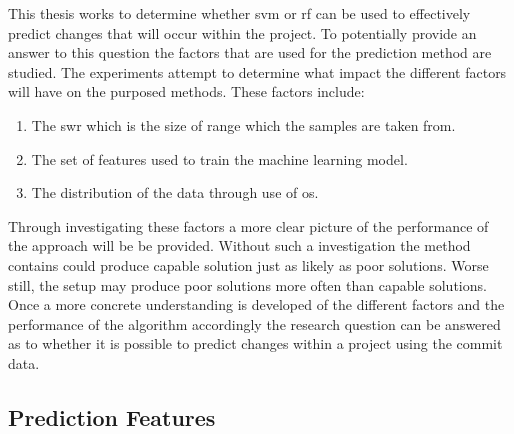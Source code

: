 This thesis works to determine whether \gls{svm} or \gls{rf} can be used to effectively predict changes that will occur within the project. To potentially provide an answer to this question the factors that are used for the prediction method are studied. The experiments attempt to determine what impact the different factors will have on the purposed methods. These factors include:
\begin{enumerate}
\item The \gls{swr} which is the size of range which the samples are taken from.
\item The set of features used to train the machine learning model.
\item The distribution of the data through use of \gls{os}.
\end{enumerate}

Through investigating these factors a more clear picture of the performance of the approach will be be provided. Without such a investigation the method contains could produce capable solution just as likely as poor solutions. Worse still, the setup may produce poor solutions more often than capable solutions. Once a more concrete understanding is developed of the different factors and the performance of the algorithm accordingly the research question can be answered as to whether it is possible to predict changes within a project using the commit data.

\subsection{Prediction Features}






